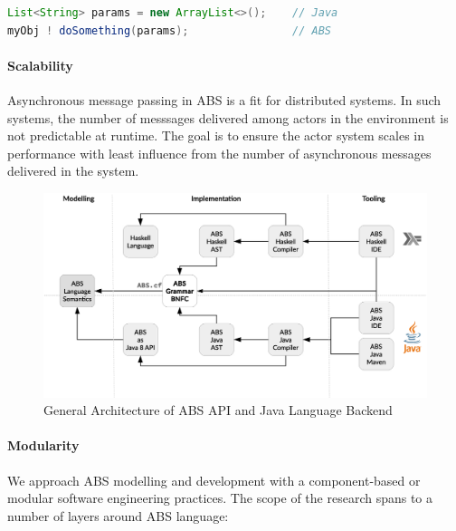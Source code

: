 \begin{lstlisting}[float=h,language=Java,caption=Using Java in ABS,label=lst:abs:java]
List<String> params = new ArrayList<>();    // Java
myObj ! doSomething(params);                // ABS
\end{lstlisting}

\paragraph{Scalability} 
Asynchronous message passing in ABS is a fit for distributed systems.
In such systems, the number of messsages delivered among actors in the 
environment is not predictable at runtime.
The goal is to ensure the actor system scales in performance with least 
influence from the number of asynchronous messages delivered in the system.

\begin{figure}[t]
\centering
\includegraphics[scale=0.3]{../figs/Arch.eps}
\caption[General Architecture]{General Architecture of ABS API and Java Language Backend}
\label{fig:arch}
\end{figure}

\paragraph{Modularity} 
We approach ABS modelling and development with a component-based or modular 
software engineering practices.
The scope of the research spans to a number of layers around ABS language:

